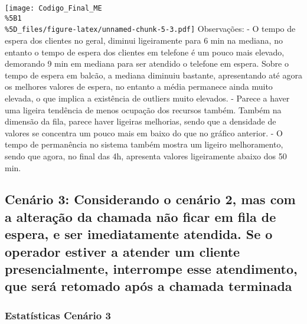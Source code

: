 \documentclass[
]{article}
\begin{document}
\texttt{[image: Codigo\_Final\_ME\\\%5B1\\\%5D\_files/figure-latex/unnamed-chunk-5-3.pdf]}
Observações: - O tempo de espera dos clientes no geral, diminui
ligeiramente para 6 min na mediana, no entanto o tempo de espera dos
clientes em telefone é um pouco mais elevado, demorando 9 min em mediana
para ser atendido o telefone em espera. Sobre o tempo de espera em
balcão, a mediana diminuiu bastante, apresentando até agora os melhores
valores de espera, no entanto a média permanece ainda muito elevada, o
que implica a existência de outliers muito elevados. - Parece a haver
uma ligeira tendência de menos ocupação dos recursos também. Também na
dimensão da fila, parece haver ligeiras melhorias, sendo que a densidade
de valores se concentra um pouco mais em baixo do que no gráfico
anterior. - O tempo de permanência no sistema também mostra um ligeiro
melhoramento, sendo que agora, no final das 4h, apresenta valores
ligeiramente abaixo dos 50 min.

\subsection{Cenário 3: Considerando o cenário 2, mas com a alteração da
chamada não ficar em fila de espera, e ser imediatamente atendida. Se o
operador estiver a atender um cliente presencialmente, interrompe esse
atendimento, que será retomado após a chamada
terminada}\label{cenuxe1rio-3-considerando-o-cenuxe1rio-2-mas-com-a-alterauxe7uxe3o-da-chamada-nuxe3o-ficar-em-fila-de-espera-e-ser-imediatamente-atendida.-se-o-operador-estiver-a-atender-um-cliente-presencialmente-interrompe-esse-atendimento-que-seruxe1-retomado-apuxf3s-a-chamada-terminada}

\subsubsection{Estatísticas Cenário
3}\label{estatuxedsticas-cenuxe1rio-3}
\end{document}
